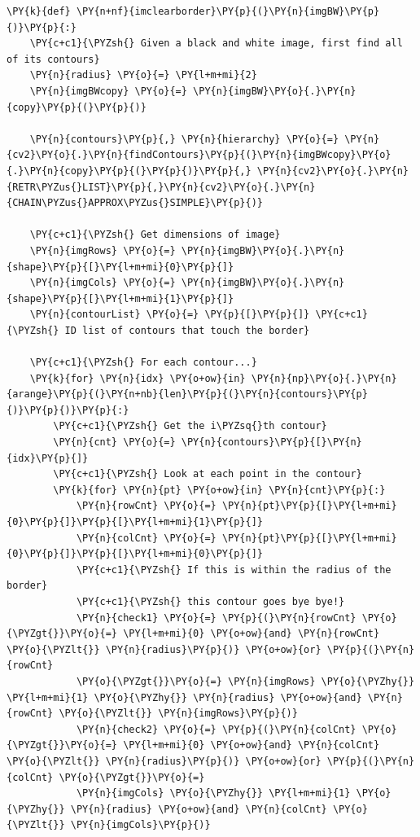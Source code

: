 \begin{tcolorbox}[breakable, size=fbox, boxrule=1pt, pad at break*=1mm,colback=cellbackground, colframe=cellborder]
	\begin{Verbatim}[commandchars=\\\{\}]
\PY{k}{def} \PY{n+nf}{imclearborder}\PY{p}{(}\PY{n}{imgBW}\PY{p}{)}\PY{p}{:}
    \PY{c+c1}{\PYZsh{} Given a black and white image, first find all of its contours}
    \PY{n}{radius} \PY{o}{=} \PY{l+m+mi}{2}
    \PY{n}{imgBWcopy} \PY{o}{=} \PY{n}{imgBW}\PY{o}{.}\PY{n}{copy}\PY{p}{(}\PY{p}{)}

    \PY{n}{contours}\PY{p}{,} \PY{n}{hierarchy} \PY{o}{=} \PY{n}{cv2}\PY{o}{.}\PY{n}{findContours}\PY{p}{(}\PY{n}{imgBWcopy}\PY{o}{.}\PY{n}{copy}\PY{p}{(}\PY{p}{)}\PY{p}{,} \PY{n}{cv2}\PY{o}{.}\PY{n}{RETR\PYZus{}LIST}\PY{p}{,}\PY{n}{cv2}\PY{o}{.}\PY{n}{CHAIN\PYZus{}APPROX\PYZus{}SIMPLE}\PY{p}{)}

    \PY{c+c1}{\PYZsh{} Get dimensions of image}
    \PY{n}{imgRows} \PY{o}{=} \PY{n}{imgBW}\PY{o}{.}\PY{n}{shape}\PY{p}{[}\PY{l+m+mi}{0}\PY{p}{]}
    \PY{n}{imgCols} \PY{o}{=} \PY{n}{imgBW}\PY{o}{.}\PY{n}{shape}\PY{p}{[}\PY{l+m+mi}{1}\PY{p}{]}
    \PY{n}{contourList} \PY{o}{=} \PY{p}{[}\PY{p}{]} \PY{c+c1}{\PYZsh{} ID list of contours that touch the border}

    \PY{c+c1}{\PYZsh{} For each contour...}
    \PY{k}{for} \PY{n}{idx} \PY{o+ow}{in} \PY{n}{np}\PY{o}{.}\PY{n}{arange}\PY{p}{(}\PY{n+nb}{len}\PY{p}{(}\PY{n}{contours}\PY{p}{)}\PY{p}{)}\PY{p}{:}
        \PY{c+c1}{\PYZsh{} Get the i\PYZsq{}th contour}
        \PY{n}{cnt} \PY{o}{=} \PY{n}{contours}\PY{p}{[}\PY{n}{idx}\PY{p}{]}
        \PY{c+c1}{\PYZsh{} Look at each point in the contour}
        \PY{k}{for} \PY{n}{pt} \PY{o+ow}{in} \PY{n}{cnt}\PY{p}{:}
            \PY{n}{rowCnt} \PY{o}{=} \PY{n}{pt}\PY{p}{[}\PY{l+m+mi}{0}\PY{p}{]}\PY{p}{[}\PY{l+m+mi}{1}\PY{p}{]}
            \PY{n}{colCnt} \PY{o}{=} \PY{n}{pt}\PY{p}{[}\PY{l+m+mi}{0}\PY{p}{]}\PY{p}{[}\PY{l+m+mi}{0}\PY{p}{]}
            \PY{c+c1}{\PYZsh{} If this is within the radius of the border}
            \PY{c+c1}{\PYZsh{} this contour goes bye bye!}
            \PY{n}{check1} \PY{o}{=} \PY{p}{(}\PY{n}{rowCnt} \PY{o}{\PYZgt{}}\PY{o}{=} \PY{l+m+mi}{0} \PY{o+ow}{and} \PY{n}{rowCnt} \PY{o}{\PYZlt{}} \PY{n}{radius}\PY{p}{)} \PY{o+ow}{or} \PY{p}{(}\PY{n}{rowCnt}
            \PY{o}{\PYZgt{}}\PY{o}{=} \PY{n}{imgRows} \PY{o}{\PYZhy{}} \PY{l+m+mi}{1} \PY{o}{\PYZhy{}} \PY{n}{radius} \PY{o+ow}{and} \PY{n}{rowCnt} \PY{o}{\PYZlt{}} \PY{n}{imgRows}\PY{p}{)}
            \PY{n}{check2} \PY{o}{=} \PY{p}{(}\PY{n}{colCnt} \PY{o}{\PYZgt{}}\PY{o}{=} \PY{l+m+mi}{0} \PY{o+ow}{and} \PY{n}{colCnt} \PY{o}{\PYZlt{}} \PY{n}{radius}\PY{p}{)} \PY{o+ow}{or} \PY{p}{(}\PY{n}{colCnt} \PY{o}{\PYZgt{}}\PY{o}{=}
            \PY{n}{imgCols} \PY{o}{\PYZhy{}} \PY{l+m+mi}{1} \PY{o}{\PYZhy{}} \PY{n}{radius} \PY{o+ow}{and} \PY{n}{colCnt} \PY{o}{\PYZlt{}} \PY{n}{imgCols}\PY{p}{)} 


\end{Verbatim}
\end{tcolorbox}
